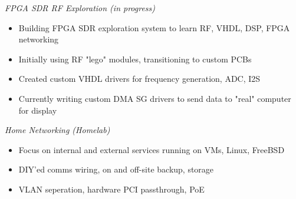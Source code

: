 \documentclass[line,mmmargin]{res}
\begin{document}
\begin{resume}
    {\sl FPGA SDR RF Exploration (in progress)}
		\begin{itemize} \itemsep -2pt
			\item Building FPGA SDR exploration system to learn RF, VHDL, DSP, FPGA networking
            \item Initially using RF "lego" modules, transitioning to custom PCBs
            \item Created custom VHDL drivers for frequency generation, ADC, I2S
            \item Currently writing custom DMA SG drivers to send data to "real" computer for display
		\end{itemize}
	\vspace{-10pt}
    {\sl Home Networking (Homelab)}
		\begin{itemize} \itemsep -2pt
			\item Focus on internal and external services running on VMs, Linux, FreeBSD
            \item DIY'ed comms wiring, on and off-site backup, storage
            \item VLAN seperation, hardware PCI passthrough, PoE
		\end{itemize}

\end{resume}
\end{document}
